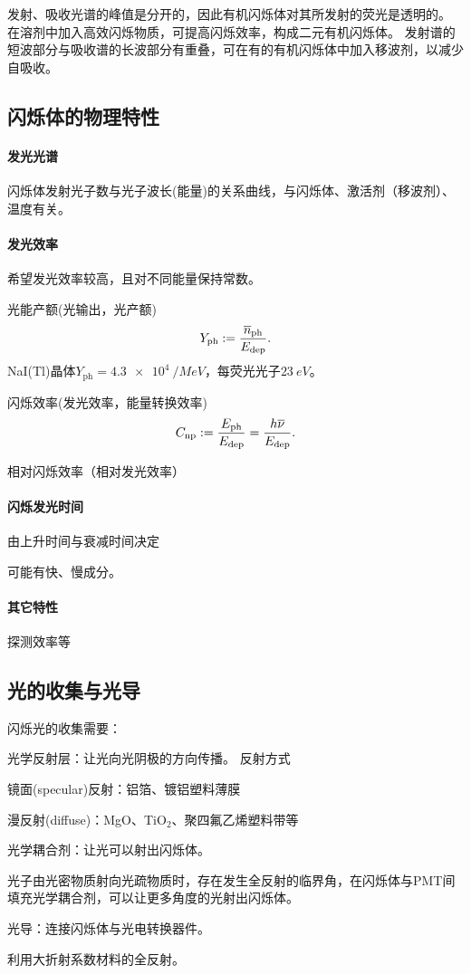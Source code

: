 发射、吸收光谱的峰值是分开的，因此有机闪烁体对其所发射的荧光是透明的。
在溶剂中加入高效闪烁物质，可提高闪烁效率，构成二元有机闪烁体。
发射谱的短波部分与吸收谱的长波部分有重叠，可在有的有机闪烁体中加入移波剂，以减少自吸收。

\subsection{闪烁体的物理特性}

\paragraph{发光光谱}
闪烁体发射光子数与光子波长(能量)的关系曲线，与闪烁体、激活剂（移波剂）、温度有关。
\paragraph{发光效率}
希望发光效率较高，且对不同能量保持常数。
\begin{compactenum}
	\item 光能产额(光输出，光产额)
	\[
		Y_{\mathrm{ph}}:=\frac{\overline{n}_{\mathrm{ph}}}{E_{\mathrm{dep}}}.
	\]
	NaI(Tl)晶体$Y_{\mathrm{ph}}=\SI{4.3e4}{/MeV}$，每荧光光子$\SI{23}{eV}$。
	\item 闪烁效率(发光效率，能量转换效率)
	\[
		C_{\mathrm{np}}:=\frac{E_{\mathrm{ph}}}{E_{\mathrm{dep}}}=\frac{h\overline{\nu}}{E_{\mathrm{dep}}}.
	\]
	\item 相对闪烁效率（相对发光效率）
\end{compactenum}
\paragraph{闪烁发光时间}
由上升时间与衰减时间决定

可能有快、慢成分。
\paragraph{其它特性}
探测效率等

\subsection{光的收集与光导}

闪烁光的收集需要：
\begin{compactitem}
	\item 光学反射层：让光向光阴极的方向传播。
	反射方式
	\begin{compactitem}
		\item 镜面(specular)反射：铝箔、镀铝塑料薄膜
		\item 漫反射(diffuse)：MgO、TiO$_2$、聚四氟乙烯塑料带等
	\end{compactitem}
	\item 光学耦合剂：让光可以射出闪烁体。
	
	光子由光密物质射向光疏物质时，存在发生全反射的临界角，在闪烁体与PMT间填充光学耦合剂，可以让更多角度的光射出闪烁体。
	\item 光导：连接闪烁体与光电转换器件。
	
	利用大折射系数材料的全反射。
\end{compactitem}

